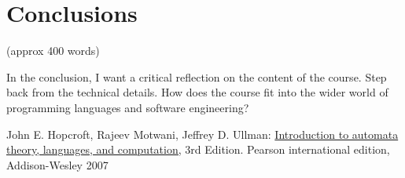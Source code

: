 \documentclass{article}
\theoremstyle{theorem}
\theoremstyle{definition}
\theoremstyle{remark}
\begin{document}
\section{Conclusions}\label{conclusions}

(approx 400 words)

In the conclusion, I want a critical reflection on the content of the course. Step back from the technical details. How does the course fit into the wider world of programming languages and software engineering?

\begin{thebibliography}{99}
	John E. Hopcroft, Rajeev Motwani, Jeffrey D. Ullman:
\href{http://ce.sharif.edu/courses/94-95/1/ce414-2/resources/root/Text%20Books/Automata/John%20E.%20Hopcroft,%20Rajeev%20Motwani,%20Jeffrey%20D.%20Ullman-Introduction%20to%20Automata%20Theory,%20Languages,%20and%20Computations-Prentice%20Hall%20(2006).pdf}{Introduction to automata theory, languages, and computation,} 3rd Edition. Pearson international edition, Addison-Wesley 2007

\end{thebibliography}
\end{document}
